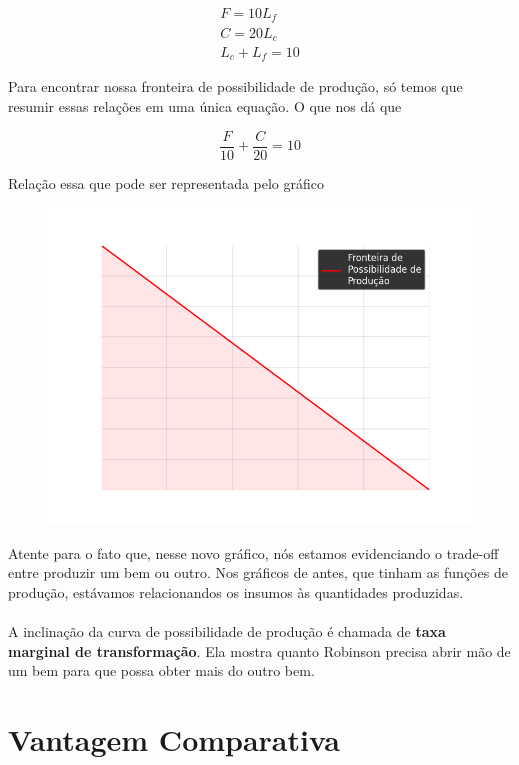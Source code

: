 \documentclass[a4paper,11pt,oneside]{book}
\theoremstyle{definition}
\theoremstyle{break}
\begin{document}
\begin{equation*}
	\begin{split}
		F = 10L_f \\
		C = 20L_c	\\
		L_c + L_f = 10
	\end{split}
\end{equation*}

Para encontrar nossa fronteira de possibilidade de produção, só temos que resumir essas relações em uma única equação. O que nos dá que

$$\frac{F}{10} + \frac{C}{20} = 10$$

Relação essa que pode ser representada pelo gráfico

\begin{figure}[H]
	\centering
	\includegraphics[scale=0.6]{cap33_9-pos_prod1.png}
\end{figure}

Atente para o fato que, nesse novo gráfico, nós estamos evidenciando o trade-off entre produzir um bem ou outro. Nos gráficos de antes, que tinham as funções de produção, estávamos relacionandos os insumos às quantidades produzidas.
\\~\\
A inclinação da curva de possibilidade de produção é chamada de \textbf{taxa marginal de transformação}. Ela mostra quanto Robinson precisa abrir mão de um bem para que possa obter mais do outro bem.

\section{Vantagem Comparativa}
\end{document}
